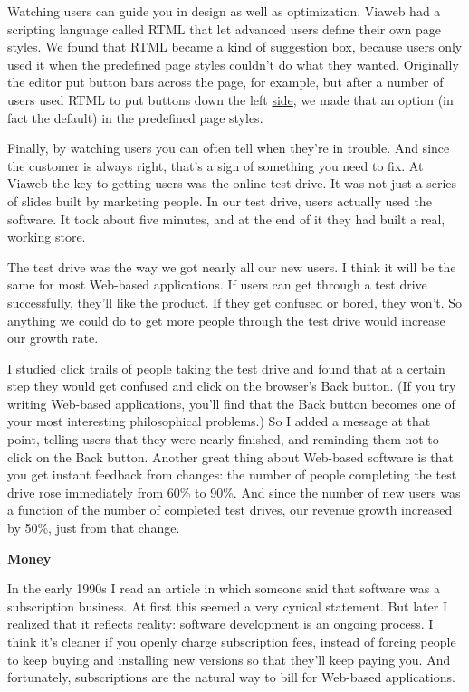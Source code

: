 Watching users can guide you in design as well as optimization. Viaweb
had a scripting language called RTML that let advanced users define
their own page styles. We found that RTML became a kind of suggestion
box, because users only used it when the predefined page styles couldn't
do what they wanted. Originally the editor put button bars across the
page, for example, but after a number of users used RTML to put buttons
down the left
\href{https://sep.turbifycdn.com/ca/I/paulgraham_1656_3563}{side}, we
made that an option (in fact the default) in the predefined page styles.

Finally, by watching users you can often tell when they're in trouble.
And since the customer is always right, that's a sign of something you
need to fix. At Viaweb the key to getting users was the online test
drive. It was not just a series of slides built by marketing people. In
our test drive, users actually used the software. It took about five
minutes, and at the end of it they had built a real, working store.

The test drive was the way we got nearly all our new users. I think it
will be the same for most Web-based applications. If users can get
through a test drive successfully, they'll like the product. If they get
confused or bored, they won't. So anything we could do to get more
people through the test drive would increase our growth rate.

I studied click trails of people taking the test drive and found that at
a certain step they would get confused and click on the browser's Back
button. (If you try writing Web-based applications, you'll find that the
Back button becomes one of your most interesting philosophical
problems.) So I added a message at that point, telling users that they
were nearly finished, and reminding them not to click on the Back
button. Another great thing about Web-based software is that you get
instant feedback from changes: the number of people completing the test
drive rose immediately from 60\% to 90\%. And since the number of new
users was a function of the number of completed test drives, our revenue
growth increased by 50\%, just from that change.

\textbf{Money}

In the early 1990s I read an article in which someone said that software
was a subscription business. At first this seemed a very cynical
statement. But later I realized that it reflects reality: software
development is an ongoing process. I think it's cleaner if you openly
charge subscription fees, instead of forcing people to keep buying and
installing new versions so that they'll keep paying you. And
fortunately, subscriptions are the natural way to bill for Web-based
applications.

